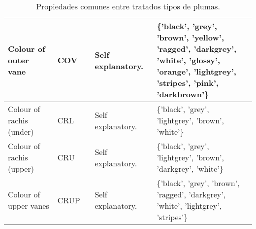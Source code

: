 \documentclass[a4paper,12pt]{article}
\begin{document}
\begin{table}[H]
\begin{tabular}{|p{0.2\linewidth}|p{0.15\linewidth}|p{0.25\linewidth}|p{0.4\linewidth}|}
		Colour of outer vane     & COV     & Self explanatory.                             & \{'black', 'grey', 'brown', 'yellow', 'ragged', 'darkgrey', 'white', 'glossy', 'orange', 'lightgrey', 'stripes', 'pink', 'darkbrown'\} \\ \hline
		Colour of rachis (under) & CRL     & Self explanatory.                             & \{'black', 'grey', 'lightgrey', 'brown', 'white'\}                                                                                     \\ \hline
		Colour of rachis (upper) & CRU     & Self explanatory.                             & \{'black', 'grey', 'lightgrey', 'brown', 'darkgrey', 'white'\}                                                                         \\ \hline
		Colour of upper vanes    & CRUP    & Self explanatory.                             & \{'black', 'grey', 'brown', 'ragged', 'darkgrey', 'white', 'lightgrey', 'stripes'\}                                                    \\ \hline
	\end{tabular}
	\caption{Propiedades comunes entre tratados tipos de plumas.}
\end{table}
\end{document}

